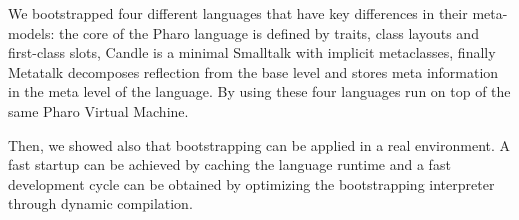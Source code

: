 We bootstrapped four different languages that have key differences in their meta-models: the core of the Pharo language is defined by traits, class layouts and first-class slots, Candle is a minimal Smalltalk with implicit metaclasses, finally Metatalk decomposes reflection from the base level and stores meta information in the meta level of the language. By using \Vtt these four languages run on top of the same Pharo Virtual Machine.

Then, we showed also that bootstrapping can be applied in a real environment. A fast startup can be achieved by caching the language runtime and a fast development cycle can be obtained by optimizing the bootstrapping interpreter through dynamic compilation.
